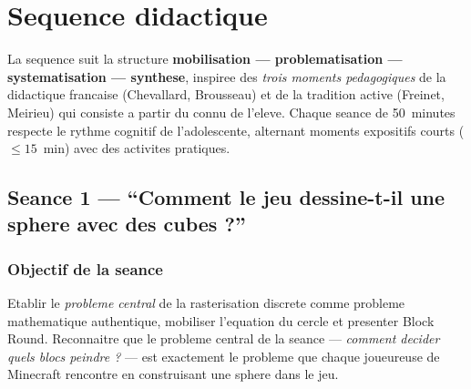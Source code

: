 \documentclass[12pt,a4paper]{scrartcl}
\newcommand{\acc}[1]{\textcolor{accent}{\textbf{#1}}}
\begin{document}
\section{Sequence didactique}\label{sec:sequencia}

La sequence suit la structure \acc{mobilisation --- problematisation --- systematisation --- synthese}, inspiree des \emph{trois moments pedagogiques} de la didactique francaise (Chevallard, Brousseau) et de la tradition active (Freinet, Meirieu) qui consiste a partir du connu de l'eleve. Chaque seance de 50~minutes respecte le rythme cognitif de l'adolescent\textperiodcentered e, alternant moments expositifs courts ($\leq 15$~min) avec des activites pratiques.

\subsection{Seance 1 --- \enquote{Comment le jeu dessine-t-il une sphere avec des cubes ?}}\label{aula1}

\subsubsection*{Objectif de la seance}
Etablir le \emph{probleme central} de la rasterisation discrete comme probleme mathematique authentique, mobiliser l'equation du cercle et presenter Block Round. Reconnaitre que le probleme central de la seance --- \emph{comment decider quels blocs peindre ?} --- est exactement le probleme que chaque joueur\textperiodcentered euse de Minecraft rencontre en construisant une sphere dans le jeu.
\end{document}

